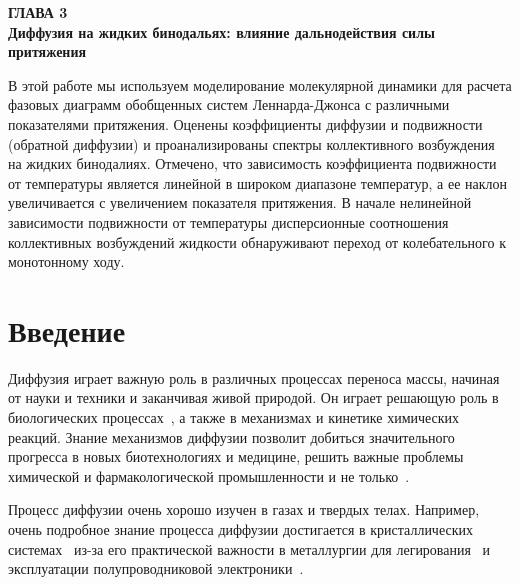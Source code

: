 
\newpage
\begin{center}
\textbf{\large ГЛАВА 3 \\ Диффузия на жидких бинодальях: влияние дальнодействия силы притяжения}
\end{center}


В этой работе мы используем моделирование молекулярной динамики для расчета фазовых диаграмм обобщенных систем Леннарда-Джонса с различными показателями притяжения. Оценены коэффициенты диффузии и подвижности (обратной диффузии) и проанализированы спектры коллективного возбуждения на жидких бинодалиях. Отмечено, что зависимость коэффициента подвижности от температуры является линейной в широком диапазоне температур, а ее наклон увеличивается с увеличением показателя притяжения. В начале нелинейной зависимости подвижности от температуры дисперсионные соотношения коллективных возбуждений жидкости обнаруживают переход от колебательного к монотонному ходу.

\section{Введение}
\label{MACR-SecIntroduction}

Диффузия играет важную роль в различных процессах переноса массы, начиная от науки и техники и заканчивая живой природой.
Он играет решающую роль в биологических процессах~\cite{10.1016/j.bbagen.2013.09.037, 10.1038/s41598-018-22643-9}, а также в механизмах и кинетике химических реакций. Знание механизмов диффузии позволит добиться значительного прогресса в новых биотехнологиях и медицине, решить важные проблемы химической и фармакологической промышленности и не только~\cite{10.1002/3527602836}.

Процесс диффузии очень хорошо изучен в газах и твердых телах. Например, очень подробное знание процесса диффузии достигается в кристаллических системах~\cite{10.1016/0079-6816(95)00039-2} из-за его практической важности в металлургии для легирования~\cite{10.1016/s0924-0136(96)02826-9, 10.1016/j.actamat.2015.10.010, 10.1134/s1063783411110308} и эксплуатации полупроводниковой электроники~\cite{10.1103/physrevlett.84.4220, 10.1016/j.physrep.2009.10.003}.


